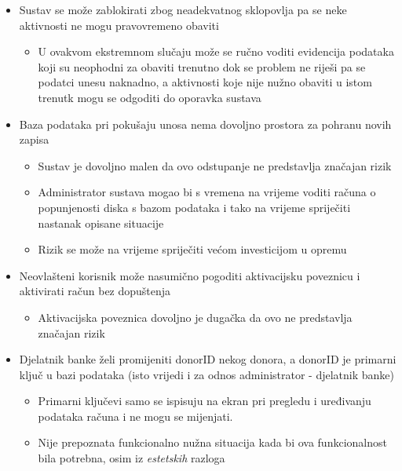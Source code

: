 \begin{itemize}
                \item Sustav se može zablokirati zbog neadekvatnog sklopovlja pa se neke aktivnosti ne mogu pravovremeno obaviti
                \begin{itemize}
                    \item U ovakvom ekstremnom slučaju može se ručno voditi evidencija podataka koji su neophodni za obaviti trenutno dok se problem ne riješi pa se podatci unesu naknadno, a aktivnosti koje nije nužno obaviti u istom trenutk mogu se odgoditi do oporavka sustava
                \end{itemize}
                
                \item Baza podataka pri pokušaju unosa nema dovoljno prostora za pohranu novih zapisa
                \begin{itemize}
                    \item Sustav je dovoljno malen da ovo odstupanje ne predstavlja značajan rizik
                    \item Administrator sustava mogao bi s vremena na vrijeme voditi računa o popunjenosti diska s bazom podataka i tako na vrijeme spriječiti nastanak opisane situacije
                    \item Rizik se može na vrijeme spriječiti većom investicijom u opremu
                \end{itemize}
                
                \item Neovlašteni korisnik može nasumično pogoditi aktivacijsku poveznicu i aktivirati račun bez dopuštenja
                \begin{itemize}
                    \item Aktivacijska poveznica dovoljno je dugačka da ovo ne predstavlja značajan rizik
                \end{itemize} 
                
                \item Djelatnik banke želi promijeniti donorID nekog donora, a donorID je primarni ključ u bazi podataka (isto vrijedi i za odnos administrator - djelatnik banke)
                \begin{itemize}
                    \item Primarni ključevi samo se ispisuju na ekran pri pregledu i uređivanju podataka računa i ne mogu se mijenjati.
                    \item Nije prepoznata funkcionalno nužna situacija kada bi ova funkcionalnost bila potrebna, osim iz \textit{estetskih} razloga 
                \end{itemize}
                

\end{itemize}
